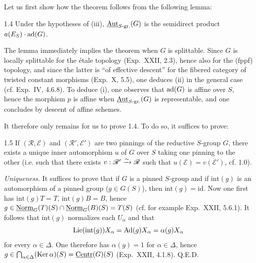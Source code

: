 Let us first show how the theorem follows from the following lemma:
\begin{lemma}{1.4}\label{XXIV.1.4}
Under the hypotheses of (iii), $\underline{\operatorname{Aut}}_{S\text{-gr.}}(G)$ is the semidirect product $a(E_S)\cdot\operatorname{ad}(G)$.
\end{lemma}

The lemma immediately implies the theorem when $G$ is splittable. Since $G$ is locally splittable for the étale topology (Exp.~XXII, 2.3), hence also for the (fppf) topology, and since the latter is ``of effective descent'' for the fibered category of twisted constant morphisms (Exp.~X, 5.5), one deduces (ii) in the general case (cf. Exp.~IV, 4.6.8). To deduce (i), one observes that $\operatorname{ad}(G)$ is affine over $S$, hence the morphism $p$ is affine when $\underline{\operatorname{Aut}}_{S\text{-gr.}}(G)$ is representable, and one concludes by descent of affine schemes.

It therefore only remains for us to prove 1.4. To do so, it suffices to prove:
\begin{lemma}{1.5}\label{XXIV.1.5}
If $(\mathscr R,\mathscr E)$ and $(\mathscr R',\mathscr E')$ are two pinnings of the reductive $S$-group $G$, there exists a unique inner automorphism $u$ of $G$ over $S$ taking one pinning to the other (i.e. such that there exists $v:\mathscr R'\xrightarrow{\sim}\mathscr R$ such that $u(\mathscr E)=v(\mathscr E')$, cf. 1.0).
\end{lemma}

\label{XXIV.1.5.1}\textit{Uniqueness.} It suffices to prove that if $G$ is a pinned $S$-group and if $\mathrm{int}(g)$ is an automorphism of a pinned group ($g\in G(S)$), then $\mathrm{int}(g)=\mathrm{id}$. Now one first has $\mathrm{int}(g)T=T$, $\mathrm{int}(g)B=B$, hence $g\in\underline{\mathrm{Norm}}_G(T)(S)\cap\underline{\mathrm{Norm}}_G(B)(S)=T(S)$ (cf. for example Exp.~XXII, 5.6.1). It follows that $\mathrm{int}(g)$ normalizes each $U_\alpha$ and that
\[
\operatorname{Lie}(\mathrm{int}(g))X_\alpha=\operatorname{Ad}(g)X_\alpha=\alpha(g)X_\alpha
\]
for every $\alpha\in\Delta$. One therefore has $\alpha(g)=1$ for $\alpha\in\Delta$, hence $g\in\bigcap_{\alpha\in\Delta}(\operatorname{Ker}\alpha)(S)=\underline{\mathrm{Centr}}(G)(S)$ (Exp.~XXII, 4.1.8). \hfill Q.E.D.


